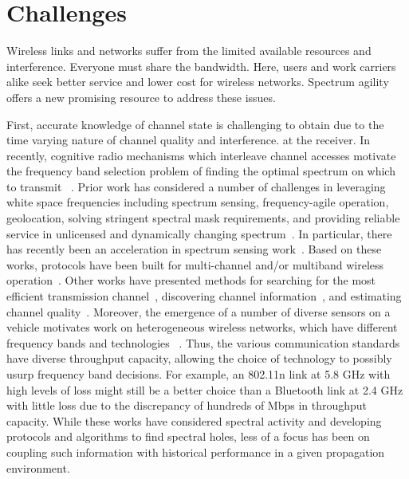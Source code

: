 \section{Challenges}

Wireless links and networks suffer from the limited available resources
and interference. Everyone must 
share the bandwidth. Here, users and work carriers alike seek 
better service and lower cost for wireless networks. 
Spectrum agility offers a new promising resource to address these issues. 

First, accurate knowledge of channel state is challenging to obtain due to the
time varying nature of channel quality and interference.
at the receiver. In recently, cognitive radio mechanisms which 
interleave channel accesses motivate the frequency band selection 
problem of finding the optimal spectrum on which to transmit
~\cite{ghasemi2008spectrum}. Prior work has considered a number of 
challenges in leveraging white space frequencies including spectrum 
sensing, frequency-agile operation, geolocation, solving stringent 
spectral mask requirements, and providing reliable service in unlicensed 
and dynamically changing spectrum~\cite{shellhammer2009technical}. In 
particular, there has recently been an acceleration in spectrum sensing 
work~\cite{rayanchu2011fluid, kim1996pulse,cabric2004implementation}. 
Based on these works, protocols have been built for multi-channel and/or 
multiband wireless operation~\cite{MOAR,raychaudhuri2003spectrum,sabharwal2007opportunistic}. 
Other works have presented methods for searching for the most efficient 
transmission channel~\cite{mo2005comparison}, discovering channel 
information~\cite{rayanchu2011fluid, sabharwal2007opportunistic}, and 
estimating channel quality~\cite{MOAR}. Moreover, the emergence of a 
number of diverse sensors on a vehicle motivates work on heterogeneous 
wireless networks, which have different frequency bands and technologies
~\cite{hossain2010vehicular}. Thus, the various communication standards 
have diverse throughput capacity, allowing the choice of technology 
to possibly usurp frequency band decisions. For example, an 802.11n 
link at 5.8 GHz with high levels of loss might still be a better choice 
than a Bluetooth link at 2.4 GHz with little loss due to the discrepancy 
of hundreds of Mbps in throughput capacity. While these works have 
considered spectral activity and developing protocols and algorithms to 
find spectral holes, less of a focus has been on coupling such information 
with historical performance in a given propagation environment.


